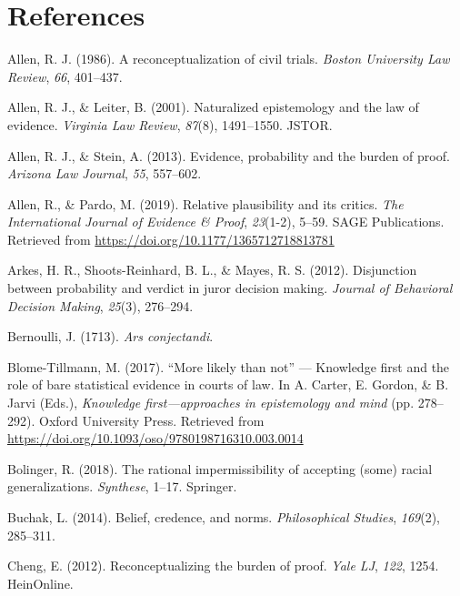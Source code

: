 \documentclass[10pt,dvipsnames,enabledeprecatedfontcommands]{scrartcl}
\begin{document}
\hypertarget{references}{%
\section{References}\label{references}}

\hypertarget{refs}{}
\leavevmode\hypertarget{ref-Allen1986A-Reconceptuali}{}%
Allen, R. J. (1986). A reconceptualization of civil trials. \emph{Boston
University Law Review}, \emph{66}, 401--437.

\leavevmode\hypertarget{ref-allen2001naturalized}{}%
Allen, R. J., \& Leiter, B. (2001). Naturalized epistemology and the law
of evidence. \emph{Virginia Law Review}, \emph{87}(8), 1491--1550.
JSTOR.

\leavevmode\hypertarget{ref-allen2013}{}%
Allen, R. J., \& Stein, A. (2013). Evidence, probability and the burden
of proof. \emph{Arizona Law Journal}, \emph{55}, 557--602.

\leavevmode\hypertarget{ref-AllenPardo2019relative}{}%
Allen, R., \& Pardo, M. (2019). Relative plausibility and its critics.
\emph{The International Journal of Evidence \& Proof}, \emph{23}(1-2),
5--59. SAGE Publications. Retrieved from
\url{https://doi.org/10.1177/1365712718813781}

\leavevmode\hypertarget{ref-arkesEtAl2012}{}%
Arkes, H. R., Shoots-Reinhard, B. L., \& Mayes, R. S. (2012).
Disjunction between probability and verdict in juror decision making.
\emph{Journal of Behavioral Decision Making}, \emph{25}(3), 276--294.

\leavevmode\hypertarget{ref-Bernoulli1713Ars-conjectandi}{}%
Bernoulli, J. (1713). \emph{Ars conjectandi}.

\leavevmode\hypertarget{ref-BlomeTillmann2017}{}%
Blome-Tillmann, M. (2017). ``More likely than not'' --- Knowledge first
and the role of bare statistical evidence in courts of law. In A.
Carter, E. Gordon, \& B. Jarvi (Eds.), \emph{Knowledge
first---approaches in epistemology and mind} (pp. 278--292). Oxford
University Press. Retrieved from
\url{https://doi.org/10.1093/oso/9780198716310.003.0014}

\leavevmode\hypertarget{ref-bolinger2018rational}{}%
Bolinger, R. (2018). The rational impermissibility of accepting (some)
racial generalizations. \emph{Synthese}, 1--17. Springer.

\leavevmode\hypertarget{ref-buchak2014belief}{}%
Buchak, L. (2014). Belief, credence, and norms. \emph{Philosophical
Studies}, \emph{169}(2), 285--311.

\leavevmode\hypertarget{ref-cheng2012reconceptualizing}{}%
Cheng, E. (2012). Reconceptualizing the burden of proof. \emph{Yale LJ},
\emph{122}, 1254. HeinOnline.
\end{document}
